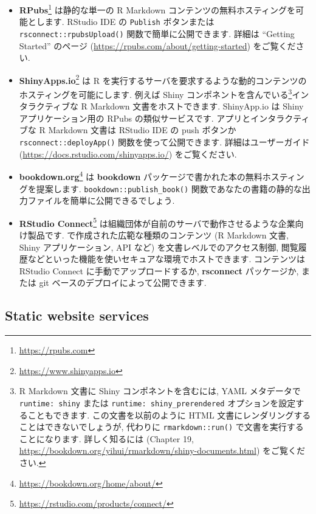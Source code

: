 \documentclass[
  11pt,
]{bxjsreport}
\renewcommand{\href}[2]{#2\footnote{\url{#1}}}
\begin{document}
\begin{itemize}
\item
  \href{https://rpubs.com}{\textbf{RPubs}} は静的な単一の R Markdown コンテンツの無料ホスティングを可能とします. RStudio IDE の \texttt{Publish} ボタンまたは \texttt{rsconnect::rpubsUpload()} 関数で簡単に公開できます. 詳細は ``Getting Started'' のページ (\url{https://rpubs.com/about/getting-started}) をご覧ください.
\item
  \href{https://www.shinyapps.io}{\textbf{ShinyApps.io}} は R を実行するサーバを要求するような動的コンテンツのホスティングを可能にします. 例えば Shiny コンポネントを含んでいる\footnote{R Markdown 文書に Shiny コンポネントを含むには, YAML メタデータで \texttt{runtime: shiny} または \texttt{runtime: shiny\_prerendered} オプションを設定することもできます. この文書を以前のように HTML 文書にレンダリングすることはできないでしょうが, 代わりに \texttt{rmarkdown::run()} で文書を実行することになります. 詳しく知るには \textcite{rmarkdown2018} (Chapter 19, \url{https://bookdown.org/yihui/rmarkdown/shiny-documents.html}) をご覧ください.}インタラクティブな R Markdown 文書をホストできます. ShinyApp.io は Shiny アプリケーション用の RPubs の類似サービスです. アプリとインタラクティブな R Markdown 文書は RStudio IDE の push ボタンか \texttt{rsconnect::deployApp()} 関数を使って公開できます. 詳細はユーザーガイド (\url{https://docs.rstudio.com/shinyapps.io/}) をご覧ください.
\item
  \href{https://bookdown.org/home/about/}{\textbf{bookdown.org}} は \textbf{bookdown} パッケージで書かれた本の無料ホスティングを提案します. \texttt{bookdown::publish\_book()} 関数であなたの書籍の静的な出力ファイルを簡単に公開できるでしょう.
\item
  \href{https://rstudio.com/products/connect/}{\textbf{RStudio Connect}} は組織団体が自前のサーバで動作させるような企業向け製品です. で作成された広範な種類のコンテンツ (R Markdown 文書, Shiny アプリケーション, API など) を文書レベルでのアクセス制御, 閲覧履歴などといった機能を使いセキュアな環境でホストできます. コンテンツは RStudio Connect に手動でアップロードするか, \textbf{rsconnect} パッケージか, または git ベースのデプロイによって公開できます.
\end{itemize}

\hypertarget{static-website-services}{%
\subsection{Static website services}\label{static-website-services}}
\end{document}
